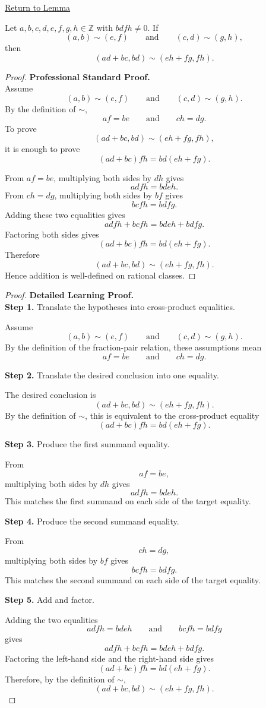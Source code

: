 \newpage
{}
\label{prf:rational-addition-well-defined}

\begin{remark*}[Return]
\hyperref[lem:rational-addition-well-defined]{Return to Lemma}
\end{remark*}

\begin{lemma*}
Let $a,b,c,d,e,f,g,h\in\mathbb{Z}$ with $bdfh\neq 0$. If
\[
(a,b)\sim(e,f)
\qquad\text{and}\qquad
(c,d)\sim(g,h),
\]
then
\[
(ad+bc,bd)\sim(eh+fg,fh).
\]
\end{lemma*}

\begin{proof}
\textbf{Professional Standard Proof.}~\\
Assume
\[
(a,b)\sim(e,f)
\qquad\text{and}\qquad
(c,d)\sim(g,h).
\]
By the definition of $\sim$,
\[
af=be
\qquad\text{and}\qquad
ch=dg.
\]
To prove
\[
(ad+bc,bd)\sim(eh+fg,fh),
\]
it is enough to prove
\[
(ad+bc)fh=bd(eh+fg).
\]

From $af=be$, multiplying both sides by $dh$ gives
\[
adfh=bdeh.
\]
From $ch=dg$, multiplying both sides by $bf$ gives
\[
bcfh=bdfg.
\]
Adding these two equalities gives
\[
adfh+bcfh=bdeh+bdfg.
\]
Factoring both sides gives
\[
(ad+bc)fh=bd(eh+fg).
\]
Therefore
\[
(ad+bc,bd)\sim(eh+fg,fh).
\]
Hence addition is well-defined on rational classes.
\end{proof}

\begin{proof}
\textbf{Detailed Learning Proof.}~\\

\textbf{Step 1.} Translate the hypotheses into cross-product equalities.

Assume
\[
(a,b)\sim(e,f)
\qquad\text{and}\qquad
(c,d)\sim(g,h).
\]
By the definition of the fraction-pair relation, these assumptions mean
\[
af=be
\qquad\text{and}\qquad
ch=dg.
\]

\textbf{Step 2.} Translate the desired conclusion into one equality.

The desired conclusion is
\[
(ad+bc,bd)\sim(eh+fg,fh).
\]
By the definition of $\sim$, this is equivalent to the cross-product equality
\[
(ad+bc)fh=bd(eh+fg).
\]

\textbf{Step 3.} Produce the first summand equality.

From
\[
af=be,
\]
multiplying both sides by $dh$ gives
\[
adfh=bdeh.
\]
This matches the first summand on each side of the target equality.

\textbf{Step 4.} Produce the second summand equality.

From
\[
ch=dg,
\]
multiplying both sides by $bf$ gives
\[
bcfh=bdfg.
\]
This matches the second summand on each side of the target equality.

\textbf{Step 5.} Add and factor.

Adding the two equalities
\[
adfh=bdeh
\qquad\text{and}\qquad
bcfh=bdfg
\]
gives
\[
adfh+bcfh=bdeh+bdfg.
\]
Factoring the left-hand side and the right-hand side gives
\[
(ad+bc)fh=bd(eh+fg).
\]
Therefore, by the definition of $\sim$,
\[
(ad+bc,bd)\sim(eh+fg,fh).
\]
\end{proof}


